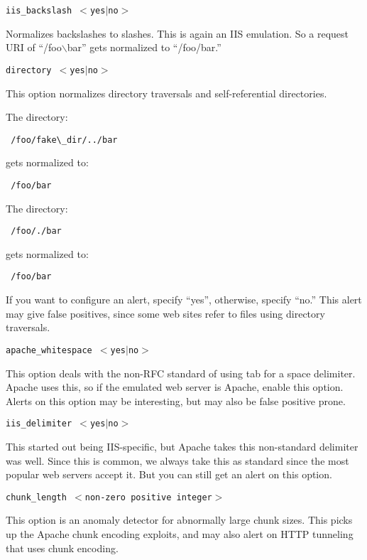 \documentclass[english]{report}
\newcounter{slistnum}
\newenvironment{slist}
{ \begin{list}{ {\bf \arabic{slistnum}.} }{\usecounter{slistnum} } }
{ \end{list} }
\begin{document}
\begin{slist}
\item \texttt{iis\_backslash $<$yes$|$no$>$}

Normalizes backslashes to slashes.  This is again an IIS emulation.  So a
request URI of ``/foo$\backslash$bar'' gets normalized to ``/foo/bar.''

\item \texttt{directory $<$yes$|$no$>$}

This option normalizes directory traversals and self-referential directories.

The directory:
\begin{verbatim} /foo/fake\_dir/../bar \end{verbatim}
gets normalized to:
\begin{verbatim} /foo/bar \end{verbatim}

The directory:
\begin{verbatim} /foo/./bar \end{verbatim}
gets normalized to:
\begin{verbatim} /foo/bar \end{verbatim}

If you want to configure an alert, specify ``yes'', otherwise, specify ``no.''
This alert may give false positives, since some web sites refer to files using
directory traversals.

\item \texttt{apache\_whitespace $<$yes$|$no$>$}

This option deals with the non-RFC standard of using tab for a space delimiter.  Apache
uses this, so if the emulated web server is Apache, enable this
option.  Alerts on this option may be interesting, but may also be false
positive prone.

\item \texttt{iis\_delimiter $<$yes$|$no$>$}

This started out being IIS-specific, but Apache takes this non-standard
delimiter was well.  Since this is common, we always take this as standard
since the most popular web servers accept it.  But you can still get an alert
on this option.

\item \texttt{chunk\_length $<$non-zero positive integer$>$}

This option is an anomaly detector for abnormally large chunk sizes.  This
picks up the Apache chunk encoding exploits, and may also alert on HTTP
tunneling that uses chunk encoding.


\end{slist}
\end{document}

